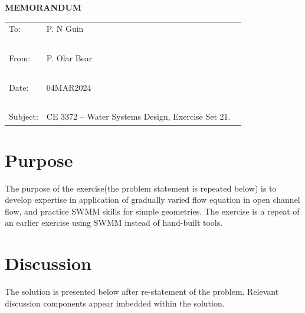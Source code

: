 \documentclass[12pt]{article}
\begin{document}
\begin{center}
\textbf{MEMORANDUM}
\end{center}
\begingroup
\begin{tabular}{p{1in} p{5in}}
\hline
\hline
To: & P. N Guin \\ ~\\
From: & P. Olar Bear \\ ~\\
Date: & 04MAR2024 \\ ~\\
Subject: & CE 3372 -- Water Systems Design, Exercise Set 21. ~\\

\hline
\hline
\end{tabular}
\endgroup


\section*{\small{Purpose}}
The purpose of the exercise(the problem statement is repeated below) is to develop expertise in application of gradually varied flow equation in open channel flow, and practice SWMM skills for simple geometries.  The exercise is a repeat of an earlier exercise using SWMM instead of hand-built tools.

\section*{\small{Discussion}}
The solution is presented below after re-statement of the problem.  Relevant discussion components appear imbedded within the solution.
\end{document}
